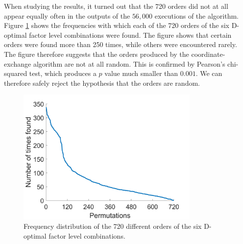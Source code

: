 
When studying the results, it turned out that the 720 orders did not at all appear equally often in the outputs of the $56,000$ executions of the algorithm. Figure \ref{figPermutations} shows the frequencies with which each of the 720 orders of the six D-optimal factor level combinations were found. The figure shows that certain orders were found more than 250 times, while others were encountered rarely. The figure therefore suggests that the orders produced by the coordinate-exchange algorithm are not at all random. This is confirmed by Pearson's chi-squared test, which produces a $p$ value much smaller than $0.001$. We can therefore safely reject the hypothesis that the orders are random.\\

\begin{figure}%
	\centering
	\includegraphics[width=0.8\textwidth]{permutations.png}
	\caption{Frequency distribution of the 720 different orders of the six D-optimal factor level combinations.}
	\label{figPermutations}
\end{figure}

